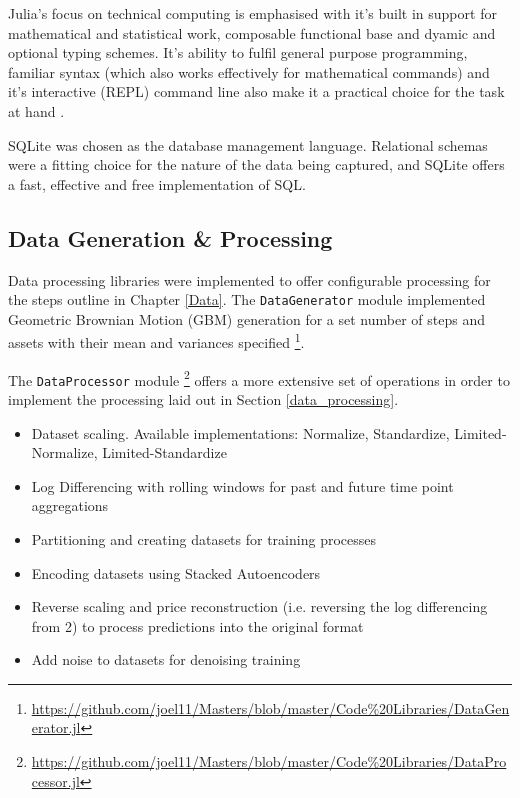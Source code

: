 \documentclass[a4paper,11pt,oneside]{article}
\theoremstyle{plain}
\theoremstyle{definition}
\begin{document}
Julia's focus on technical computing is emphasised with it's built in support for mathematical and statistical work, composable functional base and dyamic and optional typing schemes. It's ability to fulfil general purpose programming, familiar syntax (which also works effectively for mathematical commands) and it's interactive (REPL) command line also make it a practical choice for the task at hand \cite{Perkel}.\newline

SQLite was chosen as the database management language. Relational schemas were a fitting choice for the nature of the data being captured, and SQLite offers a fast, effective and free implementation of SQL.\newline


\subsection{Data Generation \& Processing}

Data processing libraries were implemented to offer configurable processing for the steps outline in Chapter \ref{Data}. The \texttt{DataGenerator} module implemented Geometric Brownian Motion (GBM) generation for a set number of steps and assets with their mean and variances specified \footnote{\url{https://github.com/joel11/Masters/blob/master/Code\%20Libraries/DataGenerator.jl}}. \newline

The \texttt{DataProcessor} module \footnote{\url{https://github.com/joel11/Masters/blob/master/Code\%20Libraries/DataProcessor.jl}} offers a more extensive set of operations in order to implement the processing laid out in Section \ref{data_processing}.


\begin{itemize}
	\item[1] Dataset scaling. Available implementations: Normalize, Standardize, Limited-Normalize, Limited-Standardize	
	\item[2] Log Differencing with rolling windows for past and future time point aggregations
	\item[3] Partitioning and creating datasets for training processes
	\item[4] Encoding datasets using Stacked Autoencoders
	\item[5] Reverse scaling and price reconstruction (i.e. reversing the log differencing from 2) to process predictions into the original format
	\item[6] Add noise to datasets for denoising training
\end{itemize}
\end{document}
